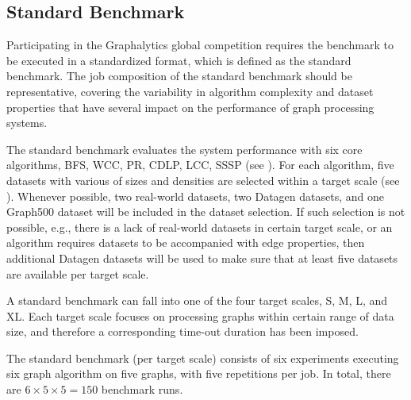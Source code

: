 \subsection{Standard Benchmark}
\label{sec:process:type:standard}
Participating in the Graphalytics global competition requires the benchmark to be executed in a standardized format, which is defined as the standard benchmark. The job composition of the standard benchmark should be representative, covering the variability in algorithm complexity and dataset properties that have several impact on the performance of graph processing systems.

The standard benchmark evaluates the system performance with six core algorithms, BFS, WCC, PR, CDLP, LCC, SSSP (see ). For each algorithm, five datasets with various of sizes and densities are selected within a target scale (see  ). Whenever possible, two real-world datasets, two Datagen datasets, and one Graph500 dataset will be included in the dataset selection. If such selection is not possible, e.g., there is a lack of real-world datasets in certain target scale, or an algorithm requires datasets to be accompanied with edge properties, then additional Datagen datasets will be used to make sure that at least five datasets are available per target scale.

A standard benchmark can fall into one of the four target scales, S, M, L, and XL. Each target scale focuses on processing graphs within certain range of data size, and therefore a corresponding time-out duration has been imposed.  

The standard benchmark (per target scale) consists of six experiments executing six graph algorithm on five graphs, with five repetitions per job. In total, there are $6 \times 5 \times 5 = 150$ benchmark runs.




